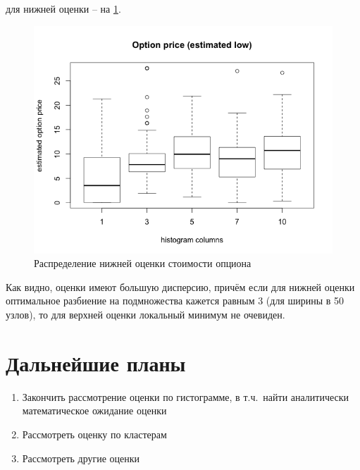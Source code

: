 \documentclass[12pt,twoside,titlepage,сa4paper]{article}
\begin{document}
	для нижней оценки -- на \ref{fig:lowerEstimate}.
	\begin{figure}[h]
		\includegraphics[width=\textwidth]{lower_estimate}
		\caption{Распределение нижней оценки стоимости опциона}
		\label{fig:lowerEstimate}
	\end{figure}
	Как видно, оценки имеют большую дисперсию, причём если для нижней оценки оптимальное разбиение на подмножества кажется равным 3 (для ширины в 50 узлов), то для верхней оценки локальный минимум не очевиден.

\section{Дальнейшие планы}
	\begin{enumerate}
		\item Закончить рассмотрение оценки по гистограмме, в т.ч.\ найти аналитически математическое ожидание оценки
		\item Рассмотреть оценку по кластерам
		\item Рассмотреть другие оценки
	\end{enumerate}
\end{document}
